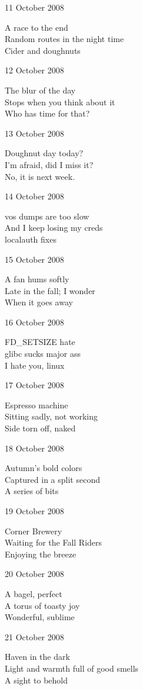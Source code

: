 \documentclass[12pt]{article}
\begin{document}
11 October 2008

A race to the end \\
Random routes in the night time \\
Cider and doughnuts

12 October 2008

The blur of the day \\
Stops when you think about it \\
Who has time for that?

13 October 2008

Doughnut day today? \\
I'm afraid, did I miss it? \\
No, it is next week.

14 October 2008

vos dumps are too slow \\
And I keep losing my creds \\
localauth fixes

15 October 2008

A fan hums softly \\
Late in the fall; I wonder \\
When it goes away

16 October 2008

FD\_SETSIZE hate \\
glibc sucks major ass \\
I hate you, linux

17 October 2008

Espresso machine \\
Sitting sadly, not working \\
Side torn off, naked

\newpage


18 October 2008

Autumn's bold colors \\
Captured in a split second \\
A series of bits

19 October 2008

Corner Brewery \\
Waiting for the Fall Riders \\
Enjoying the breeze

20 October 2008

A bagel, perfect \\
A torus of toasty joy \\
Wonderful, sublime

21 October 2008

Haven in the dark \\
Light and warmth full of good smells \\
A sight to behold
\end{document}
